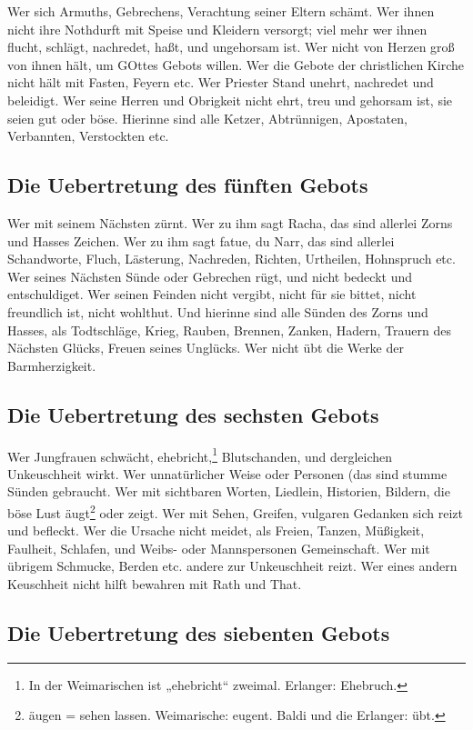 Wer sich Armuths, Gebrechens, Verachtung seiner Eltern schämt. Wer ihnen nicht ihre Nothdurft mit Speise und Kleidern versorgt; viel mehr wer ihnen flucht, schlägt, nachredet, haßt, und ungehorsam ist. Wer nicht von Herzen groß von ihnen hält, um GOttes Gebots willen. Wer die Gebote der christlichen Kirche nicht hält mit Fasten, Feyern etc. Wer Priester Stand unehrt, nachredet und beleidigt. Wer seine Herren und Obrigkeit nicht ehrt, treu und gehorsam ist, sie seien gut oder böse. Hierinne sind alle Ketzer, Abtrünnigen, Apostaten, Verbannten, Verstockten etc.

\subsection{Die Uebertretung des fünften Gebots}

Wer mit seinem Nächsten zürnt. Wer zu ihm sagt Racha, das sind allerlei Zorns und Hasses Zeichen. Wer zu ihm sagt fatue, du Narr, das sind allerlei Schandworte, Fluch, Lästerung, Nachreden, Richten, Urtheilen, Hohnspruch etc. Wer seines Nächsten Sünde oder Gebrechen rügt, und nicht bedeckt und entschuldiget. Wer seinen Feinden nicht vergibt, nicht für sie bittet, nicht freundlich ist, nicht wohlthut. Und hierinne sind alle Sünden des Zorns und Hasses, als Todtschläge, Krieg, Rauben, Brennen, Zanken, Hadern, Trauern des Nächsten Glücks, Freuen seines Unglücks. Wer nicht übt die Werke der Barmherzigkeit.

\subsection{Die Uebertretung des sechsten Gebots}

Wer Jungfrauen schwächt, ehebricht,\footnote{In der Weimarischen ist „ehebricht“ zweimal. Erlanger: Ehebruch.} Blutschanden, und dergleichen Unkeuschheit wirkt. Wer unnatürlicher Weise oder Personen (das
sind stumme Sünden gebraucht. Wer mit sichtbaren Worten, Liedlein, Historien, Bildern, die böse Lust äugt\footnote{äugen = sehen lassen. Weimarische: eugent. Baldi und die Erlanger: übt.} oder zeigt. Wer mit Sehen, Greifen, vulgaren Gedanken sich reizt und befleckt. Wer die Ursache nicht meidet, als Freien, Tanzen, Müßigkeit, Faulheit, Schlafen, und Weibs- oder Mannspersonen Gemeinschaft. Wer mit übrigem Schmucke, Berden etc. andere zur Unkeuschheit reizt. Wer eines andern Keuschheit nicht hilft bewahren mit Rath und That.

\subsection{Die Uebertretung des siebenten Gebots}

